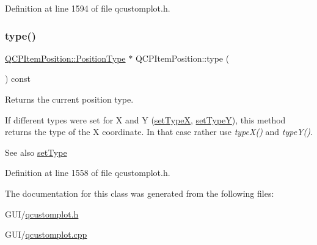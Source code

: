 Definition at line 1594 of file qcustomplot.\+h.

\mbox{\label{class_q_c_p_item_position_abfd74d86bd799306ce0295ffe433bdfc}} 
\subsubsection{\texorpdfstring{type()}{type()}}
{\footnotesize\ttfamily \hyperlink{class_q_c_p_item_position_aad9936c22bf43e3d358552f6e86dbdc8}{Q\+C\+P\+Item\+Position\+::\+Position\+Type} $\ast$ Q\+C\+P\+Item\+Position\+::type (\begin{DoxyParamCaption}{ }\end{DoxyParamCaption}) const\hspace{0.3cm}{\ttfamily [inline]}}

Returns the current position type.

If different types were set for X and Y (\hyperlink{class_q_c_p_item_position_a2113b2351d6d00457fb3559a4e20c3ea}{set\+TypeX}, \hyperlink{class_q_c_p_item_position_ac2a454aa5a54c1615c50686601ec4510}{set\+TypeY}), this method returns the type of the X coordinate. In that case rather use {\itshape type\+X()} and {\itshape type\+Y()}.

\begin{DoxySeeAlso}{See also}
\hyperlink{class_q_c_p_item_position_aa476abf71ed8fa4c537457ebb1a754ad}{set\+Type} 
\end{DoxySeeAlso}


Definition at line 1558 of file qcustomplot.\+h.



The documentation for this class was generated from the following files\+:\begin{DoxyCompactItemize}
\item 
G\+U\+I/\hyperlink{qcustomplot_8h}{qcustomplot.\+h}\item 
G\+U\+I/\hyperlink{qcustomplot_8cpp}{qcustomplot.\+cpp}\end{DoxyCompactItemize}
